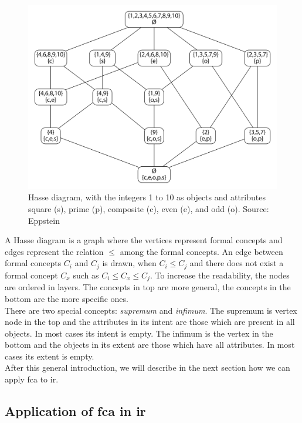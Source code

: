 \documentclass[11pt]{report}
\begin{document}
\begin{figure}[!ht]
	\centering
	\includegraphics[width=\linewidth]{./images/fcaExample}
\caption{Hasse diagram, with the integers 1 to 10 as objects and attributes square (s), prime (p), composite (c), even (e), and odd (o). Source: Eppstein \cite{fcaexample}}
\label{figure:example}
\end{figure}

A Hasse diagram is a graph where the vertices represent formal concepts and edges represent the relation $\le$ among the formal concepts. An edge between formal concepts $C_i$ and $C_j$ is drawn, when $C_i \le C_j$ and there does not exist a formal concept $C_x$ such as $C_i \le C_x \le C_j$. To increase the readability, the nodes are ordered in layers. The concepts in top are more general, the concepts in the bottom are the more specific ones.\\

There are two special concepts: \textit{supremum} and \textit{infimum}. The supremum is vertex node in the top and the attributes in its intent are those which are present in all objects. In most cases its intent is empty. The infimum is the vertex in the bottom and the objects in its extent are those which have all attributes. In most cases its extent is empty.\\

After this general introduction, we will describe in the next section how we can apply \acrshort{fca} to \acrshort{ir}.

\subsection{Application of \acrshort{fca} in \acrshort{ir}}
\label{section:fcair}
\end{document}
